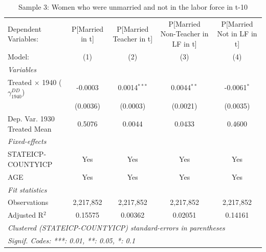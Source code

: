 
\begin{table}[htbp]
   \caption{Sample 3: Women who were unmarried and not in the labor force in t-10}
   \centering
   \begin{tabular}{lcccc}
      \tabularnewline \midrule \midrule
      Dependent Variables:                           & P[Married in t] & P[Married Teacher in t] & P[Married Non-Teacher in LF in t] & P[Married Not in LF in t]\\  
      Model:                                         & (1)             & (2)                     & (3)                               & (4)\\  
      \midrule
      \emph{Variables}\\
      Treated $\times$ 1940 ($\gamma_{1940}^{DD}$)   & -0.0003         & 0.0014$^{***}$          & 0.0044$^{**}$                     & -0.0061$^{*}$\\   
                                                     & (0.0036)        & (0.0003)                & (0.0021)                          & (0.0035)\\   
      Dep. Var. 1930 Treated Mean                    & 0.5076          & 0.0044                  & 0.0433                            & 0.4600\\  
      \midrule
      \emph{Fixed-effects}\\
      STATEICP-COUNTYICP                             & Yes             & Yes                     & Yes                               & Yes\\  
      AGE                                            & Yes             & Yes                     & Yes                               & Yes\\  
      \midrule
      \emph{Fit statistics}\\
      Observations                                   & 2,217,852       & 2,217,852               & 2,217,852                         & 2,217,852\\  
      Adjusted R$^2$                                 & 0.15575         & 0.00362                 & 0.02051                           & 0.14161\\  
      \midrule \midrule
      \multicolumn{5}{l}{\emph{Clustered (STATEICP-COUNTYICP) standard-errors in parentheses}}\\
      \multicolumn{5}{l}{\emph{Signif. Codes: ***: 0.01, **: 0.05, *: 0.1}}\\
   \end{tabular}
\end{table}


